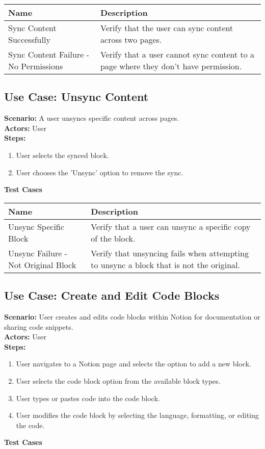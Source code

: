 \documentclass{article}
\begin{document}
            \begin{longtable}{|p{}|p{}|}
            \hline
            \textbf{Name} & \textbf{Description} \\
            \hline
            Sync Content Successfully & Verify that the user can sync content across two pages. \\
\hline
Sync Content Failure - No Permissions & Verify that a user cannot sync content to a page where they don't have permission. \\
\hline
\end{longtable}\subsection{\textbf{Use Case: Unsync Content}}
\textbf{Scenario:} A user unsyncs specific content across pages.\\
\textbf{Actors:} User\\
\textbf{Steps:}
\begin{enumerate}
\item User selects the synced block.
\item User chooses the 'Unsync' option to remove the sync.
\end{enumerate}
\textbf{Test Cases}

            \begin{longtable}{|p{}|p{}|}
            \hline
            \textbf{Name} & \textbf{Description} \\
            \hline
            Unsync Specific Block & Verify that a user can unsync a specific copy of the block. \\
\hline
Unsync Failure - Not Original Block & Verify that unsyncing fails when attempting to unsync a block that is not the original. \\
\hline
\end{longtable}\subsection{\textbf{Use Case: Create and Edit Code Blocks}}
\textbf{Scenario:} User creates and edits code blocks within Notion for documentation or sharing code snippets.\\
\textbf{Actors:} User\\
\textbf{Steps:}
\begin{enumerate}
\item User navigates to a Notion page and selects the option to add a new block.
\item User selects the code block option from the available block types.
\item User types or pastes code into the code block.
\item User modifies the code block by selecting the language, formatting, or editing the code.
\end{enumerate}
\textbf{Test Cases}
\end{document}
